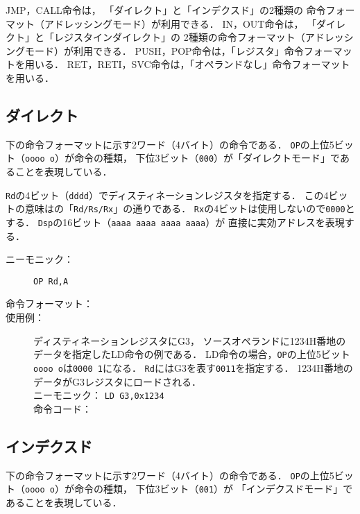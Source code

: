 JMP，CALL命令は，
「ダイレクト」と「インデクスド」の2種類の
命令フォーマット（アドレッシングモード）が利用できる．
IN，OUT命令は，
「ダイレクト」と「レジスタインダイレクト」の
2種類の命令フォーマット（アドレッシングモード）が利用できる．
PUSH，POP命令は，「レジスタ」命令フォーマットを用いる．
RET，RETI，SVC命令は，「オペランドなし」命令フォーマットを用いる．

\subsection{ダイレクト}
下の命令フォーマットに示す2ワード（4バイト）の命令である．
\texttt{OP}の上位5ビット（\texttt{oooo o}）が命令の種類，
下位3ビット（\texttt{000}）が「ダイレクトモード」であることを表現している．

\texttt{Rd}の4ビット（\texttt{dddd}）でディスティネーションレジスタを指定する．
この4ビットの意味はの「\texttt{Rd/Rs/Rx}」の通りである．
\texttt{Rx}の4ビットは使用しないので\texttt{0000}とする．
\texttt{Dsp}の16ビット（\texttt{aaaa aaaa aaaa aaaa}）が
直接に実効アドレスを表現する．

\begin{description}
\item[ニーモニック：] \texttt{OP Rd,A}

\item[命令フォーマット：] %

\item[使用例：] ディスティネーションレジスタにG3，
ソースオペランドに1234H番地のデータを指定したLD命令の例である．
LD命令の場合，\texttt{OP}の上位5ビット\texttt{oooo o}は\texttt{0000 1}になる．
\texttt{Rd}にはG3を表す\texttt{0011}を指定する．
1234H番地のデータがG3レジスタにロードされる． \\
ニーモニック： \texttt{LD G3,0x1234} \\
命令コード：
\end{description}

\subsection{インデクスド}
下の命令フォーマットに示す2ワード（4バイト）の命令である．
\texttt{OP}の上位5ビット（\texttt{oooo o}）が命令の種類，
下位3ビット（\texttt{001}）が
「インデクスドモード」であることを表現している．

